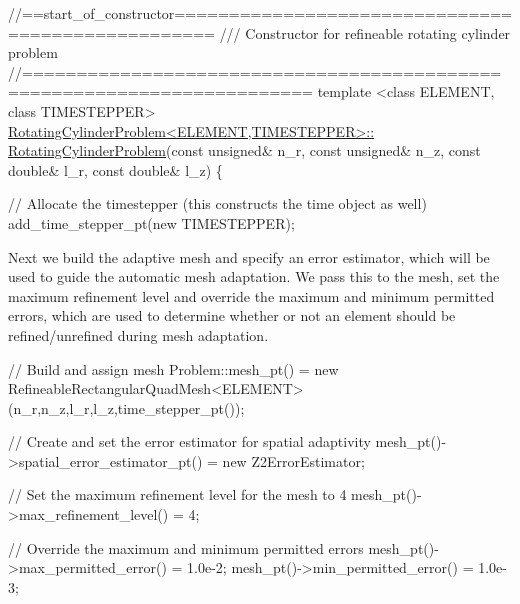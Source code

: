\begin{DoxyCodeInclude}
\textcolor{comment}{//==start\_of\_constructor==================================================}
\textcolor{comment}{/// Constructor for refineable rotating cylinder problem}
\textcolor{comment}{}\textcolor{comment}{//========================================================================}
\textcolor{keyword}{template} <\textcolor{keyword}{class} ELEMENT, \textcolor{keyword}{class} TIMESTEPPER>
\hyperlink{classRotatingCylinderProblem_a436b0ff8c4ac33acfe10492c587ad80d}{RotatingCylinderProblem<ELEMENT,TIMESTEPPER>::}
\hyperlink{classRotatingCylinderProblem_a436b0ff8c4ac33acfe10492c587ad80d}{RotatingCylinderProblem}(\textcolor{keyword}{const} \textcolor{keywordtype}{unsigned}& n\_r, \textcolor{keyword}{const} \textcolor{keywordtype}{unsigned}& n\_z,
                        \textcolor{keyword}{const} \textcolor{keywordtype}{double}& l\_r, \textcolor{keyword}{const} \textcolor{keywordtype}{double}& l\_z)
\{

 \textcolor{comment}{// Allocate the timestepper (this constructs the time object as well)}
 add\_time\_stepper\_pt(\textcolor{keyword}{new} TIMESTEPPER);

\end{DoxyCodeInclude}


Next we build the adaptive mesh and specify an error estimator, which will be used to guide the automatic mesh adaptation. We pass this to the mesh, set the maximum refinement level and override the maximum and minimum permitted errors, which are used to determine whether or not an element should be refined/unrefined during mesh adaptation.


\begin{DoxyCodeInclude}
 \textcolor{comment}{// Build and assign mesh}
 Problem::mesh\_pt() = \textcolor{keyword}{new} RefineableRectangularQuadMesh<ELEMENT>
  (n\_r,n\_z,l\_r,l\_z,time\_stepper\_pt());

 \textcolor{comment}{// Create and set the error estimator for spatial adaptivity}
 mesh\_pt()->spatial\_error\_estimator\_pt() = \textcolor{keyword}{new} Z2ErrorEstimator;
 
 \textcolor{comment}{// Set the maximum refinement level for the mesh to 4}
 mesh\_pt()->max\_refinement\_level() = 4;

 \textcolor{comment}{// Override the maximum and minimum permitted errors}
 mesh\_pt()->max\_permitted\_error() = 1.0e-2;
 mesh\_pt()->min\_permitted\_error() = 1.0e-3;

\end{DoxyCodeInclude}


